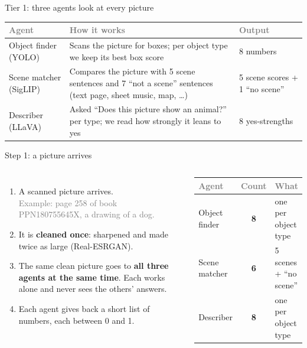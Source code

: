 \documentclass[aspectratio=169,11pt]{beamer}
\newcommand{\h}[1]{\textcolor{grey}{#1}}
\newcommand{\remark}[1]{\par\vspace{0.35cm}{\small\textcolor{grey}{#1}}}
\begin{document}
\begin{frame}{Tier 1: three agents look at every picture}
\begin{tabular}{@{}L{2.6cm} L{6.6cm} L{3.6cm}@{}}
\toprule
\h{Agent} & \h{How it works} & \h{Output}\\
\midrule
Object finder (YOLO) & Scans the picture for boxes; per object type we keep its best box score & 8 numbers\\
Scene matcher (SigLIP) & Compares the picture with 5 scene sentences and 7 ``not a scene'' sentences (text page, sheet music, map, \dots) & 5 scene scores + 1 ``no scene''\\
Describer (LLaVA) & Asked ``Does this picture show an animal?'' per type; we read how strongly it leans to yes & 8 yes-strengths\\
\bottomrule
\end{tabular}
\remark{Before the agents look, every scan is restored once (Real-ESRGAN, twice the size). The text reader (Kosmos) is not used for decisions: it cannot read these old prints reliably.}
\end{frame}

\begin{frame}{Step 1: a picture arrives}
\begin{columns}[T]
\begin{enumerate}\setlength\itemsep{8pt}
  \item A scanned picture arrives.\\ \textcolor{grey}{Example: page 258 of book PPN180755645X, a drawing of a dog.}
  \item It is \textbf{cleaned once}: sharpened and made twice as large (Real-ESRGAN).
  \item The same clean picture goes to \textbf{all three agents at the same time}. Each works alone and never sees the others' answers.
  \item Each agent gives back a short list of numbers, each between 0 and 1.
\end{enumerate}
\footnotesize
\begin{tabular}{@{}l c L{2.1cm}@{}}
\toprule
\h{Agent} & \h{Count} & \h{What}\\
\midrule
Object finder & \textbf{8} & one per object type\\
Scene matcher & \textbf{6} & 5 scenes + ``no scene''\\
Describer & \textbf{8} & one per object type\\
\bottomrule
\end{tabular}
\end{columns}
\remark{The 8 object types: person, child, animal, building, weapon, vehicle, tree, text. The 5 scenes: teaching, family, playing, landscape, drawing.}
\end{frame}
\end{document}
